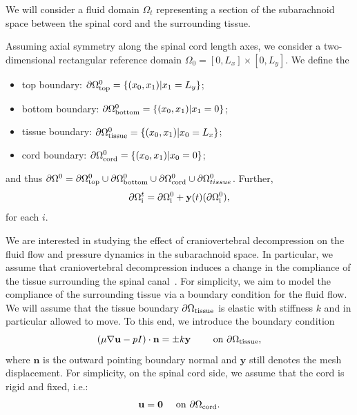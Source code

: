 \documentclass[11pt,a4paper,titlepage]{report}
\begin{document}
We will consider a fluid domain $\Omega_t$ representing a section of
the subarachnoid space between the spinal cord and the surrounding
tissue.

Assuming axial symmetry along the spinal cord length axes, we consider
a two-dimensional rectangular reference domain $\Omega_0 = [0, L_x]
\times [0, L_y]$. We define the
\begin{itemize}
\item
  top boundary: $\partial \Omega_{\rm top}^0 = \{ (x_0, x_1) | x_1 = L_y\}$;
\item
  bottom boundary: $\partial \Omega_{\rm bottom}^0 = \{ (x_0, x_1) | x_1 = 0\}$;
\item
  tissue boundary: $\partial \Omega_{\rm tissue}^0 = \{ (x_0, x_1) | x_0 = L_x\}$;
\item
  cord boundary: $\partial \Omega_{\rm cord}^0 = \{ (x_0, x_1) | x_0 = 0\}$;
\end{itemize}
and thus $\partial \Omega^0 = \partial \Omega_{\rm top}^0 \cup
\partial \Omega_{\rm bottom}^0 \cup \partial \Omega_{\rm cord}^0 \cup
\partial \Omega_{tissue}^0$. Further,
\begin{equation}
  \partial \Omega^t_{\rm i} = \partial \Omega^0_{\rm i} + \mathbf{y}(t)(\partial \Omega^0_{\rm i}),
\end{equation}
for each $i$.

We are interested in studying the effect of craniovertebral
decompression on the fluid flow and pressure dynamics in the
subarachnoid space. In particular, we assume that craniovertebral
decompression induces a change in the compliance of the tissue
surrounding the spinal canal~\cite{}. For simplicity, we aim to model
the compliance of the surrounding tissue via a boundary condition for
the fluid flow. We will assume that the tissue boundary $\partial
\Omega_{\rm tissue}$ is elastic with stiffness $k$ and in particular
allowed to move. To this end, we introduce the boundary condition
\begin{equation}
  \left ( \mu \nabla \mathbf{u} - p I
  \right ) \cdot \mathbf{n} = \pm k \mathbf{y}
  \qquad \text{ on }  \partial \Omega_{\rm tissue},
\end{equation}
where $\mathbf{n}$ is the outward pointing boundary normal and
$\mathbf{y}$ still denotes the mesh displacement. For simplicity, on
the spinal cord side, we assume that the cord is rigid and fixed,
i.e.:
\begin{equation}
  \mathbf{u} = \mathbf{0} \quad \text { on } \partial \Omega_{\rm cord}.
\end{equation}
\end{document}
